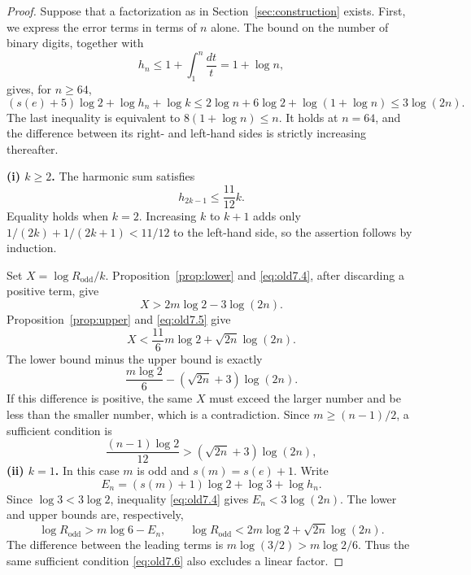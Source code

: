 \documentclass[11pt,a4paper]{article}
\numberwithin{equation}{section}
\theoremstyle{definition}
\begin{document}
\begin{proof}
Suppose that a factorization as in Section~\ref{sec:construction} exists. First, we express the error terms in terms of \(n\) alone. The bound on the number of binary digits, together with
\[
h_n\le1+\int_1^n\frac{dt}{t}=1+\log n,
\]
gives, for \(n\ge64\),
\begin{equation}
(s(e)+5)\log2+\log h_n+\log k
\le2\log n+6\log2+\log(1+\log n)
\le3\log(2n).
\label{eq:old7.4}
\end{equation}
The last inequality is equivalent to \(8(1+\log n)\le n\). It holds at \(n=64\), and the difference between its right- and left-hand sides is strictly increasing thereafter.

\textbf{(i) \(k\ge2\).} The harmonic sum satisfies
\begin{equation}
h_{2k-1}\le\frac{11}{12}k.
\label{eq:old7.5}
\end{equation}
Equality holds when \(k=2\). Increasing \(k\) to \(k+1\) adds only \(1/(2k)+1/(2k+1)<11/12\) to the left-hand side, so the assertion follows by induction.

Set \(X=\log R_{\mathrm{odd}}/k\). Proposition~\ref{prop:lower} and \eqref{eq:old7.4}, after discarding a positive term, give
\begin{equation}\label{eq:comparison_lower}
X>2m\log2-3\log(2n).
\end{equation}
Proposition~\ref{prop:upper} and \eqref{eq:old7.5} give
\begin{equation}\label{eq:comparison_upper}
X<\frac{11}{6}m\log2+\sqrt{2n}\log(2n).
\end{equation}
The lower bound minus the upper bound is exactly
\begin{equation}\label{eq:comparison_gap}
\frac{m\log2}{6}-(\sqrt{2n}+3)\log(2n).
\end{equation}
If this difference is positive, the same \(X\) must exceed the larger number and be less than the smaller number, which is a contradiction. Since \(m\ge(n-1)/2\), a sufficient condition is
\begin{equation}
\frac{(n-1)\log2}{12}>
(\sqrt{2n}+3)\log(2n),
\label{eq:old7.6}
\end{equation}
\textbf{(ii) \(k=1\).} In this case \(m\) is odd and \(s(m)=s(e)+1\). Write
\[
E_n=(s(m)+1)\log2+\log3+\log h_n.
\]
Since \(\log3<3\log2\), inequality \eqref{eq:old7.4} gives \(E_n<3\log(2n)\). The lower and upper bounds are, respectively,
\[
\log R_{\mathrm{odd}}>m\log6-E_n,
\qquad
\log R_{\mathrm{odd}}<2m\log2+\sqrt{2n}\log(2n).
\]
The difference between the leading terms is \(m\log(3/2)>m\log2/6\). Thus the same sufficient condition \eqref{eq:old7.6} also excludes a linear factor.


\end{proof}
\end{document}
